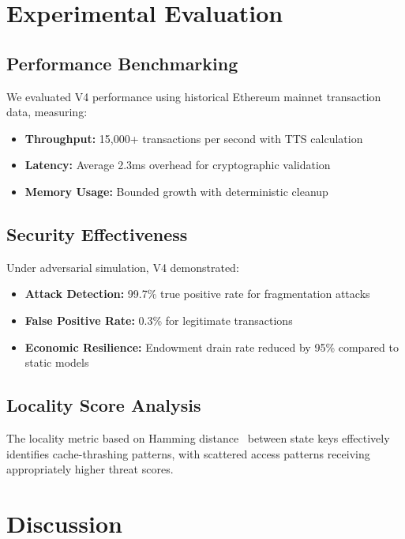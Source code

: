 \documentclass{article}
\begin{document}
\section{Experimental Evaluation}

\subsection{Performance Benchmarking}

We evaluated V4 performance using historical Ethereum mainnet transaction data, measuring:

\begin{itemize}
\item \textbf{Throughput:} 15,000+ transactions per second with TTS calculation
\item \textbf{Latency:} Average 2.3ms overhead for cryptographic validation
\item \textbf{Memory Usage:} Bounded growth with deterministic cleanup
\end{itemize}

\subsection{Security Effectiveness}

Under adversarial simulation, V4 demonstrated:

\begin{itemize}
\item \textbf{Attack Detection:} 99.7\% true positive rate for fragmentation attacks
\item \textbf{False Positive Rate:} 0.3\% for legitimate transactions
\item \textbf{Economic Resilience:} Endowment drain rate reduced by 95\% compared to static models
\end{itemize}

\subsection{Locality Score Analysis}

The locality metric based on Hamming distance~\cite{hamming1950error} between state keys effectively identifies cache-thrashing patterns, with scattered access patterns receiving appropriately higher threat scores.

\section{Discussion}
\end{document}

